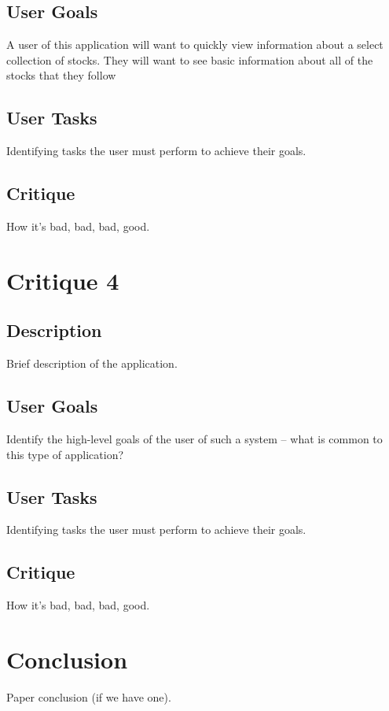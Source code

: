 \documentclass{sigchi}
\begin{document}
\subsection{User Goals}
A user of this application will want to quickly view information about a select collection of stocks.  
They will want to see basic information about all of the stocks that they follow 

\subsection{User Tasks}
Identifying tasks the user must perform to achieve their goals.

\subsection{Critique}
How it's bad, bad, bad, good.



\section{Critique 4}
\subsection{Description}
Brief description of the application.

\subsection{User Goals}
Identify the high-level goals of the user of such a system – what is common to this type of
application?

\subsection{User Tasks}
Identifying tasks the user must perform to achieve their goals.

\subsection{Critique}
How it's bad, bad, bad, good.









\section{Conclusion}
Paper conclusion (if we have one).
\end{document}
